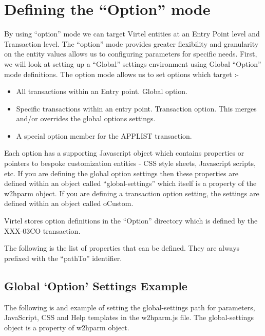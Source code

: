 \documentclass[letterpaper,10pt,english]{sphinxmanual}
\begin{document}
\section{Defining the “Option” mode}
\label{\detokenize{TN202002:defining-the-option-mode}}
By using “option” mode we can target Virtel entities at an Entry Point level and Transaction level. The “option” mode provides greater flexibility and granularity on the entity values allows us to configuring parameters for specific needs. First, we will look at setting up a “Global” settings environment using Global “Option” mode definitions. The option mode allows us to set options which target :-
\begin{itemize}
\item {} 
All transactions within an Entry point. Global option.

\item {} 
Specific transactions within an entry point. Transaction option. This merges and/or overrides the global options settings.

\item {} 
A special option member for the APPLIST transaction.

\end{itemize}

Each option has a supporting Javascript object which contains properties or pointers to bespoke customization entities - CSS style sheets, Javascript scripts, etc. If you are defining the global option settings then these properties are defined within an object called “global-settings” which itself is a property of the w2hparm object. If you are defining a transaction option setting, the settings are defined within an object called oCustom.

Virtel stores option definitions in the “Option” directory which is defined by the XXX-03CO transaction.

The following is the list of properties that can be defined. They are always prefixed with the “pathTo” identifier.


\subsection{Global ‘Option’ Settings Example}
\label{\detokenize{TN202002:global-option-settings-example}}
The following is and example of setting the global-settings path for parameters, JavaScript, CSS and Help templates in the w2hparm.js file. The global-settings object is a property of w2hparm object.
\end{document}
